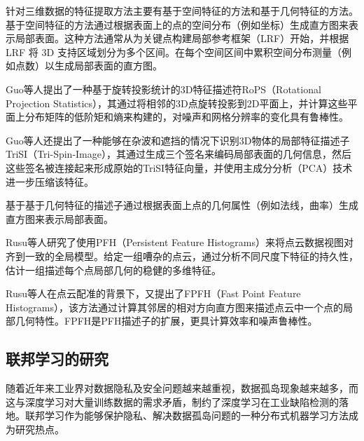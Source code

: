针对三维数据的特征提取方法主要有基于空间特征的方法和基于几何特征的方法。\cite{georgiouSurveyTraditionalDeep2020,guoNovelLocalSurface2015,guoComprehensivePerformanceEvaluation2016,hutchisonUniqueSignaturesHistograms2010,liu3DImagingAnalysis2020,rusuAligningPointCloud2008,rusuFastPointFeature2009,tombariCombinedTextureshapeDescriptor2011,yangEffectSpatialInformation2017,yangTOLDIEffectiveRobust2017,yulanguoRoPSLocalFeature2013,zhangNotAllPoints2022,zhaoHoPPFNovelLocal2020}基于空间特征的方法通过根据表面上的点的空间分布（例如坐标）生成直方图来表示局部表面。这种方法通常从为关键点构建局部参考框架（LRF）开始，并根据 LRF 将 3D 支持区域划分为多个区间。在每个空间区间中累积空间分布测量（例如点数）以生成局部表面的直方图。\cite{guoComprehensivePerformanceEvaluation2016}

Guo等人\cite{yulanguoRoPSLocalFeature2013}提出了一种基于旋转投影统计的3D特征描述符RoPS（Rotational Projection Statistics），其通过将相邻的3D点旋转投影到2D平面上，并计算这些平面上分布矩阵的低阶矩和熵来构建的，对噪声和网格分辨率的变化具有鲁棒性。

Guo等人\cite{guoNovelLocalSurface2015}还提出了一种能够在杂波和遮挡的情况下识别3D物体的局部特征描述子TriSI（Tri-Spin-Image），其通过生成三个签名来编码局部表面的几何信息，然后这些签名被连接起来形成原始的TriSI特征向量，并使用主成分分析（PCA）技术进一步压缩该特征。

基于基于几何特征的描述子通过根据表面上点的几何属性（例如法线，曲率）生成直方图来表示局部表面。

Rusu等人\cite{rusuAligningPointCloud2008}研究了使用PFH（Persistent Feature Histograms）来将点云数据视图对齐到一致的全局模型。给定一组嘈杂的点云，通过分析不同尺度下特征的持久性，估计一组描述每个点局部几何的稳健的多维特征。

Rusu等人\cite{rusuFastPointFeature2009}在点云配准的背景下，又提出了FPFH（Fast Point Feature Histograms），该方法通过计算其邻居的相对方向直方图来描述点云中一个点的局部几何特性。FPFH是PFH描述子的扩展，更具计算效率和噪声鲁棒性。





\subsection{联邦学习的研究}
随着近年来工业界对数据隐私及安全问题越来越重视，数据孤岛现象越来越多，而这与深度学习对大量训练数据的需求矛盾，制约了深度学习在工业缺陷检测的落地。联邦学习作为能够保护隐私、解决数据孤岛问题的一种分布式机器学习方法成为研究热点。\cite{banabilahFederatedLearningReview2022,liFederatedLearningChallenges2020,liuRecentAdvancesFederated2023,mammenFederatedLearningOpportunities2021}

